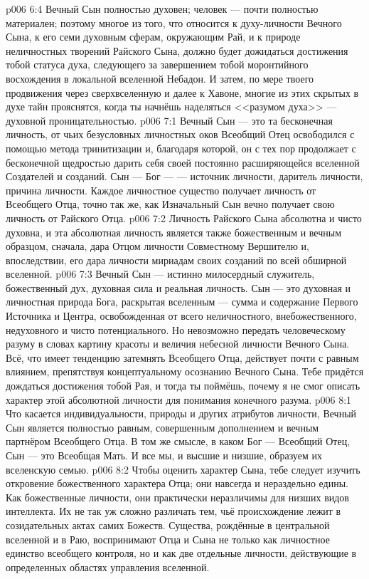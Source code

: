 \vs p006 6:4 Вечный Сын полностью духовен; человек --- почти полностью материален; поэтому многое из того, что относится к духу\hyp{}личности Вечного Сына, к его семи духовным сферам, окружающим Рай, и к природе неличностных творений Райского Сына, должно будет дожидаться достижения тобой статуса духа, следующего за завершением тобой моронтийного восхождения в локальной вселенной Небадон. И затем, по мере твоего продвижения через сверхвселенную и далее к Хавоне, многие из этих скрытых в духе тайн прояснятся, когда ты начнёшь наделяться <<разумом духа>> --- духовной проницательностью.
\vs p006 7:1 Вечный Сын --- это та бесконечная личность, от чьих безусловных личностных оков Всеобщий Отец освободился с помощью метода тринитизации и, благодаря которой, он с тех пор продолжает с бесконечной щедростью дарить себя своей постоянно расширяющейся вселенной Создателей и созданий. Сын ---  Бог ---  --- источник личности, даритель личности, причина личности. Каждое личностное существо получает личность от Всеобщего Отца, точно так же, как Изначальный Сын вечно получает свою личность от Райского Отца.
\vs p006 7:2 Личность Райского Сына абсолютна и чисто духовна, и эта абсолютная личность является также божественным и вечным образцом, сначала, дара Отцом личности Совместному Вершителю и, впоследствии, его дара личности мириадам своих созданий по всей обширной вселенной.
\vs p006 7:3 Вечный Сын --- истинно милосердный служитель, божественный дух, духовная сила и реальная личность. Сын --- это духовная и личностная природа Бога, раскрытая вселенным --- сумма и содержание Первого Источника и Центра, освобожденная от всего неличностного, внебожественного, недуховного и чисто потенциального. Но невозможно передать человеческому разуму в словах картину красоты и величия небесной личности Вечного Сына. Всё, что имеет тенденцию затемнять Всеобщего Отца, действует почти с равным влиянием, препятствуя концептуальному осознанию Вечного Сына. Тебе придётся дождаться достижения тобой Рая, и тогда ты поймёшь, почему я не смог описать характер этой абсолютной личности для понимания конечного разума.
\vs p006 8:1 Что касается индивидуальности, природы и других атрибутов личности, Вечный Сын является полностью равным, совершенным дополнением и вечным партнёром Всеобщего Отца. В том же смысле, в каком Бог --- Всеобщий Отец, Сын --- это Всеобщая Мать. И все мы, и высшие и низшие, образуем их вселенскую семью.
\vs p006 8:2 Чтобы оценить характер Сына, тебе следует изучить откровение божественного характера Отца; они навсегда и нераздельно едины. Как божественные личности, они практически неразличимы для низших видов интеллекта. Их не так уж сложно различать тем, чьё происхождение лежит в созидательных актах самих Божеств. Существа, рождённые в центральной вселенной и в Раю, воспринимают Отца и Сына не только как личностное единство всеобщего контроля, но и как две отдельные личности, действующие в определенных областях управления вселенной.
